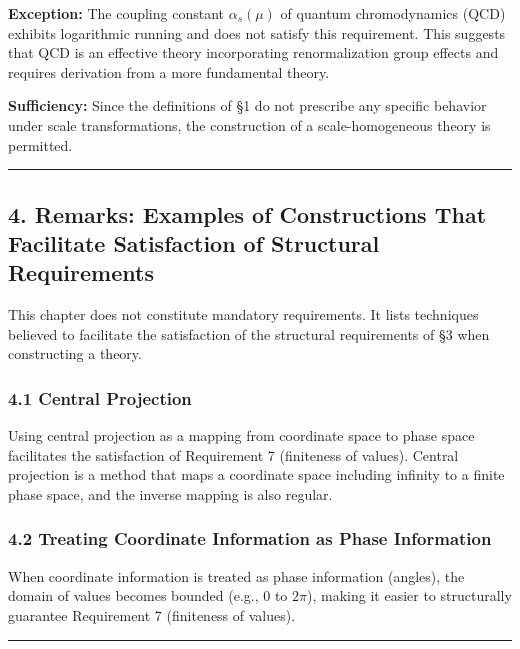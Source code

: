 \documentclass[a4paper,11pt]{article}
\begin{document}
\textbf{Exception:} The coupling constant \(\alpha_s(\mu)\) of quantum
chromodynamics (QCD) exhibits logarithmic running and does not satisfy
this requirement. This suggests that QCD is an effective theory
incorporating renormalization group effects and requires derivation from
a more fundamental theory.

\textbf{Sufficiency:} Since the definitions of §1 do not prescribe any
specific behavior under scale transformations, the construction of a
scale-homogeneous theory is permitted.

\begin{center}\rule{0.5\linewidth}{0.5pt}\end{center}

\subsection{4. Remarks: Examples of Constructions That Facilitate
Satisfaction of Structural
Requirements}\label{remarks-examples-of-constructions-that-facilitate-satisfaction-of-structural-requirements}

This chapter does not constitute mandatory requirements. It lists
techniques believed to facilitate the satisfaction of the structural
requirements of §3 when constructing a theory.

\subsubsection{4.1 Central Projection}\label{central-projection}

Using central projection as a mapping from coordinate space to phase
space facilitates the satisfaction of Requirement 7 (finiteness of
values). Central projection is a method that maps a coordinate space
including infinity to a finite phase space, and the inverse mapping is
also regular.

\subsubsection{4.2 Treating Coordinate Information as Phase
Information}\label{treating-coordinate-information-as-phase-information}

When coordinate information is treated as phase information (angles),
the domain of values becomes bounded (e.g., \(0\) to \(2\pi\)), making
it easier to structurally guarantee Requirement 7 (finiteness of
values).

\begin{center}\rule{0.5\linewidth}{0.5pt}\end{center}
\end{document}
